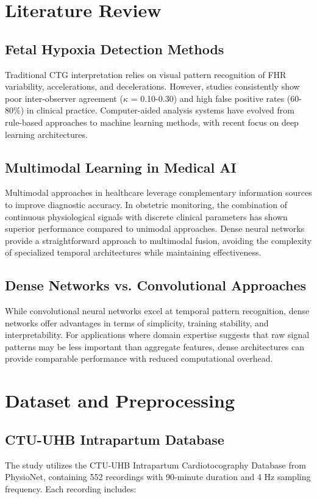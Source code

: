 \documentclass[12pt,a4paper]{article}
\begin{document}
\section{Literature Review}

\subsection{Fetal Hypoxia Detection Methods}
Traditional CTG interpretation relies on visual pattern recognition of FHR variability, accelerations, and decelerations. However, studies consistently show poor inter-observer agreement ($\kappa$ = 0.10-0.30) and high false positive rates (60-80\%) in clinical practice. Computer-aided analysis systems have evolved from rule-based approaches to machine learning methods, with recent focus on deep learning architectures.

\subsection{Multimodal Learning in Medical AI}
Multimodal approaches in healthcare leverage complementary information sources to improve diagnostic accuracy. In obstetric monitoring, the combination of continuous physiological signals with discrete clinical parameters has shown superior performance compared to unimodal approaches. Dense neural networks provide a straightforward approach to multimodal fusion, avoiding the complexity of specialized temporal architectures while maintaining effectiveness.

\subsection{Dense Networks vs. Convolutional Approaches}
While convolutional neural networks excel at temporal pattern recognition, dense networks offer advantages in terms of simplicity, training stability, and interpretability. For applications where domain expertise suggests that raw signal patterns may be less important than aggregate features, dense architectures can provide comparable performance with reduced computational overhead.

\section{Dataset and Preprocessing}

\subsection{CTU-UHB Intrapartum Database}
The study utilizes the CTU-UHB Intrapartum Cardiotocography Database from PhysioNet, containing 552 recordings with 90-minute duration and 4 Hz sampling frequency. Each recording includes:
\end{document}
